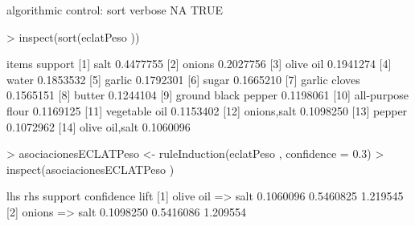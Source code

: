 \documentclass [a4paper] {article}
\begin{document}
\begin{Schunk}
\begin{Soutput}
algorithmic control:
 sort verbose
   NA    TRUE
\end{Soutput}
\begin{Sinput}
> inspect(sort(eclatPeso ))
\end{Sinput}
\begin{Soutput}
     items                 support  
[1]  {salt}                0.4477755
[2]  {onions}              0.2027756
[3]  {olive oil}           0.1941274
[4]  {water}               0.1853532
[5]  {garlic}              0.1792301
[6]  {sugar}               0.1665210
[7]  {garlic cloves}       0.1565151
[8]  {butter}              0.1244104
[9]  {ground black pepper} 0.1198061
[10] {all-purpose flour}   0.1169125
[11] {vegetable oil}       0.1153402
[12] {onions,salt}         0.1098250
[13] {pepper}              0.1072962
[14] {olive oil,salt}      0.1060096
\end{Soutput}
\begin{Sinput}
> asociacionesECLATPeso <- ruleInduction(eclatPeso , confidence = 0.3)
> inspect(asociacionesECLATPeso )
\end{Sinput}
\begin{Soutput}
    lhs            rhs    support   confidence lift    
[1] {olive oil} => {salt} 0.1060096 0.5460825  1.219545
[2] {onions}    => {salt} 0.1098250 0.5416086  1.209554
\end{Soutput}
\end{Schunk}
\end{document}
